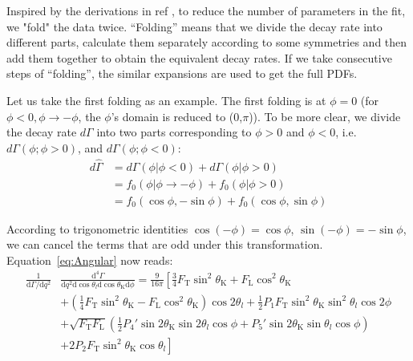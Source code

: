 Inspired by the derivations in ref \cite{LHCb2}\cite{Matias2012}, to reduce the number of parameters in the fit, we "fold" the data twice.
``Folding'' means that we divide the decay rate into different parts, calculate them separately according to some symmetries and then add them together to obtain the equivalent decay rates.
If we take consecutive steps of ``folding'', the similar expansions are used to get the full PDFs.

Let us take the first folding as an example.
The first folding is at $ \phi=0$ (for $\phi<0,\phi\rightarrow-\phi$, the $\phi$'s domain is reduced to (0,$\pi$)).
To be more clear, we divide the decay rate $d\Gamma$ into two parts corresponding to $\phi>0$ and $\phi<0$, i.e. $d\Gamma(\phi;\phi>0)$, and $d\Gamma(\phi;\phi<0)$:
\begin{equation} \label{eq:folding}
  \begin{split}
    d\hat{\Gamma} &= d\Gamma(\phi|\phi<0) + d\Gamma(\phi|\phi>0) \\
    & = f_0(\phi|\phi\rightarrow-\phi) + f_0(\phi|\phi>0) \\
    & = f_0(\cos\phi, -\sin\phi) + f_0(\cos\phi, \sin\phi)
  \end{split}
\end{equation}

According to trigonometric identities $\cos(-\phi) = \cos\phi $, $\sin(-\phi) = -\sin\phi $, we can cancel the terms that are odd under this transformation.
Equation~\ref{eq:Angular} now reads:
\begin{equation} \label{eq:fold1}
  \begin{split}
    \frac{1}{\mathrm{d}\Gamma/\mathrm{d}q^2}&\frac{\mathrm{d}^4\Gamma}{\mathrm{d}q^2 \mathrm{d}\cos\theta_l \mathrm{d}\cos\theta_\mathrm{K} \mathrm{d}\phi} = \frac{9}{16\pi}\left[\frac{3}{4}F_\mathrm{T}\sin^2\theta_\mathrm{K} + F_\mathrm{L}\cos^2\theta_\mathrm{K} \right.\\
      &\left.+(\frac{1}{4}F_\mathrm{T}\sin^2\theta_\mathrm{K}-F_\mathrm{L}\cos^2\theta_\mathrm{K})\cos2\theta_l+\frac{1}{2}P_1F_\mathrm{T}\sin^2\theta_\mathrm{K}\sin^2\theta_l\cos 2\phi \right.\\
      &+\sqrt{F_\mathrm{T}F_\mathrm{L}}(\frac{1}{2}P_4'\sin2\theta_\mathrm{K}\sin2\theta_l\cos\phi+P_5'\sin2\theta_\mathrm{K}\sin\theta_l\cos\phi )\\
      &\left.+2P_2F_\mathrm{T}\sin^2\theta_\mathrm{K}\cos\theta_l \right]
  \end{split}
\end{equation}


